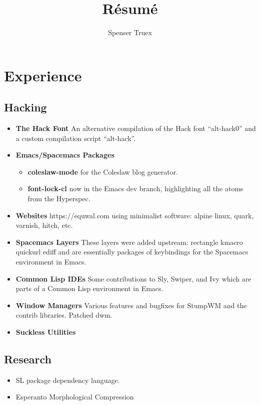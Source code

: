 


\title{R\'esum\'e}
\author{Spenser Truex}

\maketitle

\section{Experience}
\subsection{Hacking}
\begin{itemize}[\\] %
\item {\bfseries The Hack Font}
An alternative compilation of the Hack font ``alt-hack0'' and a custom compilation script ``alt-hack''.

\item{\bfseries Emacs/Spacemacs Packages}
\begin{itemize}[\\]
    \item {{\bfseries coleslaw-mode} for the Coleslaw blog generator.}
    \item {{\bfseries font-lock-cl} now in the Emacs dev branch, highlighting all the atoms from the Hyperspec.}
\end{itemize}
\item {{\bfseries Websites} https://equwal.com using minimalist software: alpine linux, quark, varnish, hitch, etc.}
    \item {{\bfseries Spacemacs Layers} These layers were added upstream:
rectangle
kmacro
quickurl
ediff
        and are essentially packages of keybindings for the Spacemacs environment in Emacs.}
\item {{\bfseries Common Lisp IDEs} Some contributions to Sly, Swiper, and Ivy which are parts of a Common Lisp environment in Emacs.}
\item {{\bfseries Window Managers} Various features and bugfixes for StumpWM and the contrib libraries. Patched dwm.}
\item {\bfseries Suckless Utilities}
\end{itemize}
\subsection{Research}
\begin{itemize}[\\]
    \item{SL package dependency language.}
    \item{Esperanto Morphological Compression}
\end{itemize}

